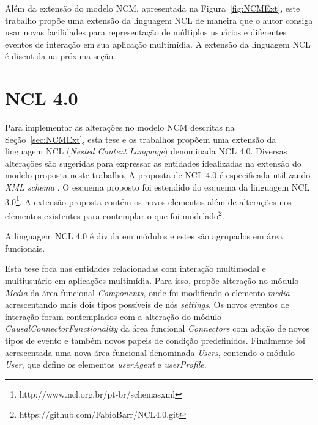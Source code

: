 Além da extensão do modelo NCM, apresentada na Figura~\ref{fig:NCMExt}, este trabalho propõe uma extensão da linguagem NCL de maneira que o autor consiga usar novas facilidades para representação de múltiplos usuários e diferentes eventos de interação em sua aplicação multimídia. A extensão da linguagem NCL é discutida na próxima seção.

\section{NCL 4.0}

Para implementar as alterações no modelo NCM descritas na Seção~\ref{sec:NCMExt}, esta tese e os trabalhos \cite{barreto2019authoring,montevecchi2020providing,valentim2020possibilitando,Josue:2018:MSE:3204949.3204967, barreto2019ncl_u, barreto2019providing_MU,barreto2019providing} propõem uma extensão da linguagem NCL (\textit{Nested Context Language}) denominada NCL 4.0. Diversas alterações são sugeridas para expressar as entidades idealizadas na extensão do modelo proposta neste trabalho. A proposta de NCL 4.0 
é especificada utilizando \textit{XML schema} \cite{thompson2004xml}. O esquema proposto foi estendido do esquema da linguagem NCL 3.0\footnote{http://www.ncl.org.br/pt-br/schemasxml}. A extensão proposta contém os novos elementos além de alterações nos elementos existentes para contemplar o que foi modelado\footnote{https://github.com/FabioBarr/NCL4.0.git}.

A linguagem NCL 4.0 é divida em módulos e estes são agrupados em área funcionais. 



 
Esta tese foca nas entidades relacionadas com interação multimodal e multiusuário em aplicações multimídia. Para isso, propõe alteração no módulo \textit{Media} da área funcional \textit{Components}, onde foi modificado o elemento \textit{media} acrescentando mais dois tipos possíveis de nós \textit{settings}. Os novos eventos de interação foram contemplados com a alteração do módulo \textit{CausalConnectorFunctionality} da área funcional \textit{Connectors} com adição de novos tipos de evento e também novos papeis de condição predefinidos. Finalmente foi acrescentada uma nova área funcional denominada \textit{Users}, contendo o módulo \textit{User}, que define  os elementos \textit{userAgent} e \textit{userProfile}. 
 
